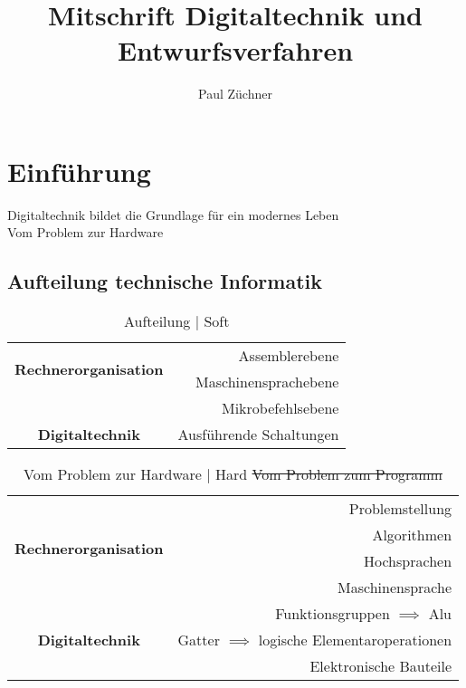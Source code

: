 \documentclass[a4paper]{scrartcl}
\title{Mitschrift Digitaltechnik und Entwurfsverfahren}
\author{Paul Züchner}
\begin{document}
	
	\maketitle
	\tableofcontents
	\newpage
	\printglossaries
	\section{Einführung}
	
	Digitaltechnik bildet die Grundlage für ein modernes Leben\\
	
	Vom Problem zur Hardware\\
	
	\subsection{Aufteilung technische Informatik}
			\begin{table}[H]
				\centering
				\begin{tabular}{ | c | r |}
					\hline
					\multirow{2}{*}{\textbf{Rechnerorganisation} } & Assemblerebene \\ \cline{2-2}
						& Maschinensprachebene \\ \cline{2-2}
						& Mikrobefehlsebene\\ \hline 
					\textbf{Digitaltechnik} & Ausführende Schaltungen \\ \hline
				\end{tabular}
				\caption{Aufteilung | Soft}
			\end{table}
		
		\begin{table}[H]
			\centering
			\begin{tabular}{ | c | r |}
				\hline
				\multirow{4}{*}{ \textbf{Rechnerorganisation} } & Problemstellung \\ \cline{2-2}
					& Algorithmen \\ \cline{2-2}
					& Hochsprachen \\ \cline{2-2}
					& Maschinensprache \\ \hline
				\multirow{3}{*}{\textbf{Digitaltechnik} } & Funktionsgruppen \( \implies \) Alu \\ \cline{2-2}
					& Gatter \( \implies \) logische Elementaroperationen  \\ \cline{2-2}
					& Elektronische Bauteile \\ \cline{2-2}
					\hline
			\end{tabular}
			\caption{Vom Problem zur Hardware  | Hard \newline \sout{Vom Problem zum Programm}}
		\end{table}
	
\end{document}
